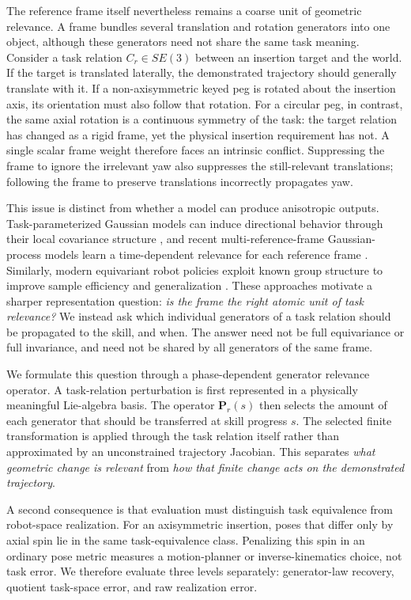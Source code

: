 \documentclass[letterpaper,10pt,conference]{ieeeconf}
\begin{document}
The reference frame itself nevertheless remains a coarse unit of geometric
relevance. A frame bundles several translation and rotation generators into one
object, although these generators need not share the same task meaning. Consider
a task relation $C_r\in SE(3)$ between an insertion target and the world. If the
target is translated laterally, the demonstrated trajectory should generally
translate with it. If a non-axisymmetric keyed peg is rotated about the
insertion axis, its orientation must also follow that rotation. For a circular
peg, in contrast, the same axial rotation is a continuous symmetry of the task:
the target relation has changed as a rigid frame, yet the physical insertion
requirement has not. A single scalar frame weight therefore faces an intrinsic
conflict. Suppressing the frame to ignore the irrelevant yaw also suppresses the
still-relevant translations; following the frame to preserve translations
incorrectly propagates yaw.

This issue is distinct from whether a model can produce anisotropic outputs.
Task-parameterized Gaussian models can induce directional behavior through
their local covariance structure \cite{Calinon2014TPGMM,Calinon2018TPModels},
and recent multi-reference-frame Gaussian-process models learn a
time-dependent relevance for each reference frame \cite{Montero2024TPGP}.
Similarly, modern equivariant robot policies exploit known group structure to
improve sample efficiency and generalization
\cite{Cohen2016GECNN,Simeonov2022NDF,Ryu2024DiffusionEDF,Yang2024EquiBot,
Gao2024RiEMann}. These approaches motivate a sharper representation question:
\emph{is the frame the right atomic unit of task relevance?} We instead ask
which individual generators of a task relation should be propagated to the
skill, and when. The answer need not be full equivariance or full invariance,
and need not be shared by all generators of the same frame.

We formulate this question through a phase-dependent generator relevance
operator. A task-relation perturbation is first represented in a physically
meaningful Lie-algebra basis. The operator
$\mathbf P_r(s)$ then selects the amount of each generator that should be
transferred at skill progress $s$. The selected finite transformation is applied
through the task relation itself rather than approximated by an unconstrained
trajectory Jacobian. This separates \emph{what geometric change is relevant}
from \emph{how that finite change acts on the demonstrated trajectory}.

A second consequence is that evaluation must distinguish task equivalence from
robot-space realization. For an axisymmetric insertion, poses that differ only
by axial spin lie in the same task-equivalence class. Penalizing this spin in an
ordinary pose metric measures a motion-planner or inverse-kinematics choice,
not task error. We therefore evaluate three levels separately: generator-law
recovery, quotient task-space error, and raw realization error.
\end{document}
